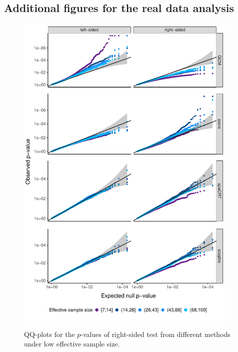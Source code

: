 \documentclass[12pt]{article}
\theoremstyle{definition}
\begin{document}


\newpage

\subsection{Additional figures for the real data analysis}\label{sec:additional_figure_realdata}

\begin{figure}[!ht]
	\centering
	\includegraphics[width=0.95\textwidth]{figures-and-tables/real-data/facet_plot_different_withglmnb_100.pdf}
	\caption{QQ-plots for the $p$-values of right-sided test from different methods under low effective sample size.}
	\label{fig:qqplot_lowess}
\end{figure}
\end{document}
